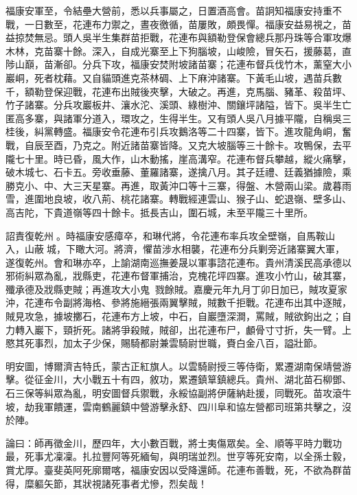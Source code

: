 \begin{pinyinscope}
福康安軍至，令結壘大營前，悉以兵事屬之，日置酒高會。苗詗知福康安持重不戰，一日數至，花連布力禦之，晝夜徼循，苗屢敗，頗畏憚。福康安益易視之，苗益掠焚無忌。頭人吳半生集群苗拒戰，花連布與額勒登保會總兵那丹珠等合軍攻爆木林，克苗寨十餘。深入，自成光寨至上下狗腦坡，山峻險，冒矢石，援藤葛，直陟山巔，苗漸卻。分兵下攻，福康安焚附坡諸苗寨；花連布督兵伐竹木，薰窒大小巖峒，死者枕藉。又自貓頭進克茶林碉、上下麻沖諸寨。下黃毛山坡，遇苗兵數千，額勒登保迎戰，花連布出賊後夾擊，大破之。再進，克馬腦、豬革、殺苗坪、竹子諸寨。分兵攻巖板井、瀼水沱、溪頭、綠樹沖、關鑲坪諸隘，皆下。吳半生亡匿高多寨，與諸軍分道入，環攻之，生得半生。又有頭人吳八月據平隴，自稱吳三桂後，糾黨轉盛。福康安令花連布引兵攻鵝洛等二十四寨，皆下。進攻龍角峒，奮戰，自辰至酉，乃克之。附近諸苗寨皆降。又克大坡腦等三十餘卡。攻鴨保，去平隴七十里。時已昏，風大作，山木動搖，崖高溝窄。花連布督兵攀越，縱火痛擊，破木城七、石卡五。旁收垂藤、董羅諸寨，遂擒八月。其子廷禮、廷義猶據險，乘勝克小、中、大三天星寨。再進，取黃沖口等十三寨，得盤、木營兩山梁。歲暮雨雪，進圍地良坡，收八荊、桃花諸寨。轉戰經連雲山、猴子山、蛇退嶺、壁多山、高吉陀，下貴道嶺等四十餘卡。抵長吉山，圍石城，未至平隴三十里所。

詔責復乾州。時福康安感瘴卒，和琳代將，令花連布率兵攻全壁嶺，自馬鞍山入，山蔽城，下瞰大河。將濟，懼苗涉水相襲，花連布分兵剿旁近諸寨翼大軍，遂復乾州。會和琳亦卒，上諭湖南巡撫姜晟以軍事諮花連布。貴州清溪民高承德以邪術糾眾為亂，戕縣吏，花連布督軍捕治，克槐花坪四寨。進攻小竹山，破其寨，殲承德及戕縣吏賊；再進攻大小鬼，戮餘賊。嘉慶元年九月丁卯日加已，賊攻夏家沖，花連布令副將海格、參將施縉張兩翼擊賊，賊數千拒戰。花連布出其中逐賊，賊見攻急，據坡擲石，花連布方上坡，中石，自巖墮深澗，罵賊，賊欲鉤出之；自力轉入巖下，頸折死。諸將爭殺賊，賊卻，出花連布尸，顱骨寸寸折，失一臂。上愍其死事烈，加太子少保，賜騎都尉兼雲騎尉世職，賚白金八百，謚壯節。

明安圖，博爾濟吉特氏，蒙古正紅旗人。以雲騎尉授三等侍衛，累遷湖南保靖營游擊。從征金川，大小戰五十有四，敘功，累遷鎮筸鎮總兵。貴州、湖北苗石柳鄧、石三保等糾眾為亂，明安圖督兵禦戰，永綏協副將伊薩納赴援，同戰死。苗攻滾牛坡，劫我軍饋運，雲南鶴麗鎮中營游擊永舒、四川阜和協左營都司班第共擊之，沒於陣。

論曰：師再徵金川，歷四年，大小數百戰，將士夷傷眾矣。全、順等平時力戰功最，死事尤凜凜。扎拉豐阿等死緬甸，與明瑞並烈。世亨等死安南，以全孫士毅，賞尤厚。臺斐英阿死廓爾喀，福康安因以受降還師。花連布善戰，死，不欲為群苗得，糜軀矢節，其狀視諸死事者尤慘，烈矣哉！


\end{pinyinscope}